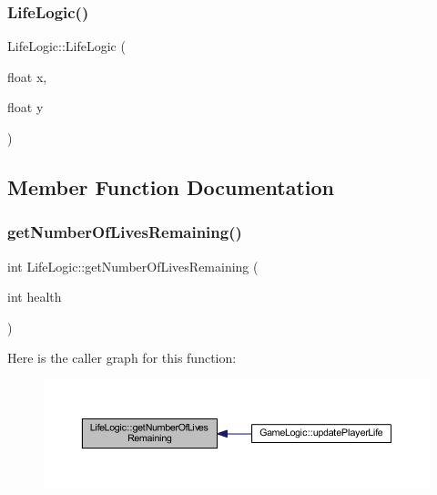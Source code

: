 \mbox{\label{class_life_logic_a535c38f9912f4298ebd1b86425a5cd59}} 
\subsubsection{\texorpdfstring{Life\+Logic()}{LifeLogic()}\hspace{0.1cm}{\footnotesize\ttfamily [2/2]}}
{\footnotesize\ttfamily Life\+Logic\+::\+Life\+Logic (\begin{DoxyParamCaption}\item[{float}]{x,  }\item[{float}]{y }\end{DoxyParamCaption})}



\subsection{Member Function Documentation}
\mbox{\label{class_life_logic_aedae9924b6ebe33182c3b8b8150b8060}} 
\subsubsection{\texorpdfstring{get\+Number\+Of\+Lives\+Remaining()}{getNumberOfLivesRemaining()}}
{\footnotesize\ttfamily int Life\+Logic\+::get\+Number\+Of\+Lives\+Remaining (\begin{DoxyParamCaption}\item[{int}]{health }\end{DoxyParamCaption})}

Here is the caller graph for this function\+:
\nopagebreak
\begin{figure}[H]
\begin{center}
\leavevmode
\includegraphics[width=350pt]{class_life_logic_aedae9924b6ebe33182c3b8b8150b8060_icgraph}
\end{center}
\end{figure}
\mbox{\label{class_life_logic_a84143479d62e550adebd0c319ae3520a}} 
